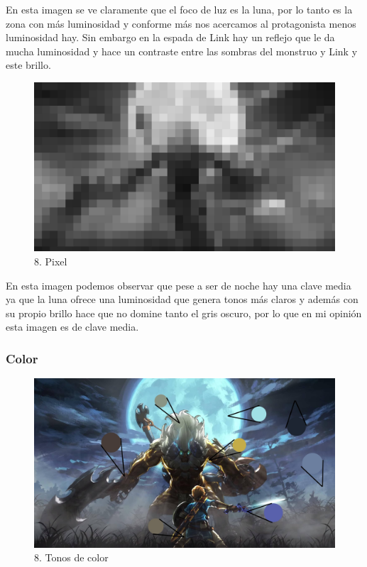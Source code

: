 \documentclass[12pt]{article}
\begin{document}
 En esta imagen se ve claramente que el foco de luz es la luna, por lo tanto es la zona con más luminosidad y conforme más nos acercamos al protagonista menos luminosidad hay. Sin embargo en la espada de Link hay un reflejo que le da mucha luminosidad y hace un contraste entre las sombras del monstruo y Link y este brillo.

\begin{figure}[H]
      \centering
      \includegraphics[scale=0.25]{images/Raúl/Sección 8/Imagen 8 gris pixel.jpg}
      \caption{\small 8. Pixel}
    \end{figure}

 En esta imagen podemos observar que pese a ser de noche hay una clave media ya que la luna ofrece una luminosidad que genera tonos más claros y además con su propio brillo hace que no domine tanto el gris oscuro, por lo que en mi opinión esta imagen es de clave media.

        \subsubsection{Color}

\begin{figure}[H]
      \centering
      \includegraphics[scale=0.25]{images/Raúl/Sección 8/Imagen 8 tonos.jpg}
      \caption{\small 8. Tonos de color}
    \end{figure}
\end{document}
